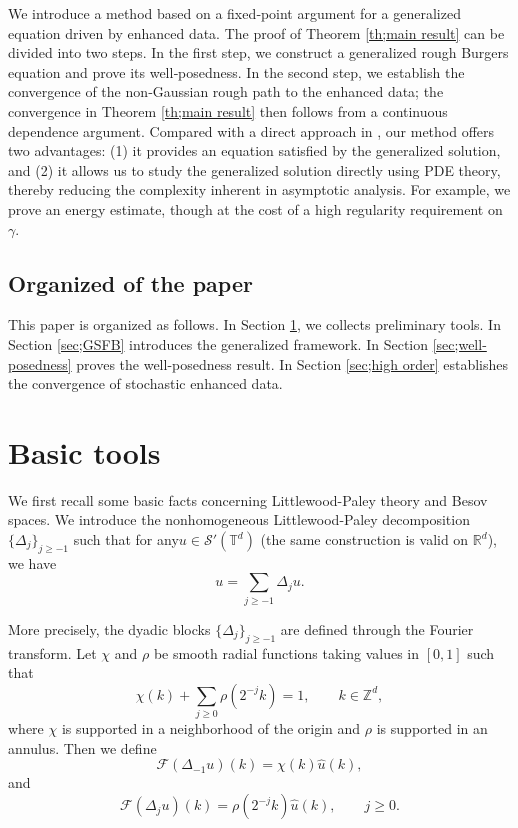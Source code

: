 \documentclass{article}
\numberwithin{equation}{section}
\begin{document}
We introduce a method based on a fixed‑point argument for a generalized equation driven by enhanced data. The proof of Theorem \ref{th;main result} can be divided into two steps. In the first step, we construct a generalized rough Burgers equation and prove its well‑posedness. In the second step, we establish the convergence of the non‑Gaussian rough path to the enhanced data; the convergence in Theorem \ref{th;main result} then follows from a continuous dependence argument. Compared with a direct approach in \cite{gubinelli2017kpz}, our method offers two advantages: (1) it provides an equation satisfied by the generalized solution, and (2) it allows us to study the generalized solution directly using PDE theory, thereby reducing the complexity inherent in asymptotic analysis. For example, we prove an energy estimate, though at the cost of a high regularity requirement on $\gamma$.

\subsection{Organized of the paper}
\par This paper is organized as follows. In Section \ref{sec;basic tools}, we collects preliminary tools. In Section \ref{sec;GSFB} introduces the generalized framework. In Section \ref{sec;well-posedness} proves the well-posedness result. In Section \ref{sec;high order} establishes the convergence of stochastic enhanced data.
\section{Basic tools}\label{sec;basic tools}
We first recall some basic facts concerning Littlewood-Paley theory and Besov spaces. We introduce the nonhomogeneous Littlewood-Paley decomposition $\{\Delta_j\}_{j\geq -1}$ such that for any$u\in\mathcal S'(\mathbb T^d)$ (the same construction is valid on
$\mathbb R^d$), we have
\[
u=\sum_{j\geq -1}\Delta_j u .
\]

More precisely, the dyadic blocks $\{\Delta_j\}_{j\geq -1}$ are defined through the Fourier transform.
Let $\chi$ and $\rho$ be smooth radial functions taking values in $[0,1]$
such that
\[
\chi(k)+\sum_{j\geq0}\rho(2^{-j}k)=1,
\qquad k\in\mathbb Z^d,
\]
where $\chi$ is supported in a neighborhood of the origin and $\rho$ is supported in an annulus. Then we define
\[
\mathcal F(\Delta_{-1}u)(k)=\chi(k)\hat u(k),
\]
and
\[
\mathcal F(\Delta_j u)(k)=\rho(2^{-j}k)\hat u(k),
\qquad j\geq0 .
\]
\end{document}
